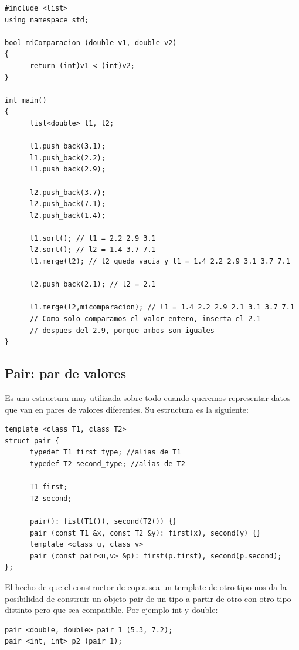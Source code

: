 \documentclass[10pt,a4paper,spanish]{report}
\begin{document}
\begin{verbatim}
#include <list>
using namespace std;

bool miComparacion (double v1, double v2)
{
      return (int)v1 < (int)v2;
}

int main()
{
      list<double> l1, l2;

      l1.push_back(3.1);
      l1.push_back(2.2);
      l1.push_back(2.9);

      l2.push_back(3.7);
      l2.push_back(7.1);
      l2.push_back(1.4);

      l1.sort(); // l1 = 2.2 2.9 3.1
      l2.sort(); // l2 = 1.4 3.7 7.1
      l1.merge(l2); // l2 queda vacia y l1 = 1.4 2.2 2.9 3.1 3.7 7.1

      l2.push_back(2.1); // l2 = 2.1

      l1.merge(l2,micomparacion); // l1 = 1.4 2.2 2.9 2.1 3.1 3.7 7.1
      // Como solo comparamos el valor entero, inserta el 2.1 
      // despues del 2.9, porque ambos son iguales
}
\end{verbatim}

\subsection{\textcolor[rgb]{0.2,0.5,0.5}Pair: par de valores}
\noindent
Es una estructura muy utilizada sobre todo cuando queremos representar datos que van en pares de valores diferentes. Su estructura es la siguiente:

\begin{verbatim}
template <class T1, class T2>
struct pair {
      typedef T1 first_type; //alias de T1
      typedef T2 second_type; //alias de T2

      T1 first;
      T2 second;

      pair(): fist(T1()), second(T2()) {}
      pair (const T1 &x, const T2 &y): first(x), second(y) {}
      template <class u, class v>
      pair (const pair<u,v> &p): first(p.first), second(p.second);
};
\end{verbatim}

\noindent
El hecho de que el constructor de copia sea un template de otro tipo nos da la posibilidad de construir un objeto pair de un tipo a partir de otro con otro tipo distinto pero que sea compatible. Por ejemplo int y double:

\begin{verbatim}
pair <double, double> pair_1 (5.3, 7.2);
pair <int, int> p2 (pair_1);
\end{verbatim}
\end{document}
